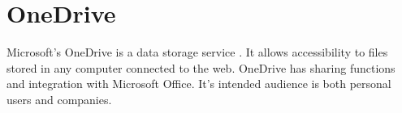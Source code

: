 \section{OneDrive}

Microsoft's OneDrive is a data storage service 
\cite{www-hid-sp18-601-odrive-website}. It allows accessibility  to files
 stored in any computer connected to the web. OneDrive has sharing functions and
 integration with Microsoft Office. It's intended audience is both personal 
users and companies.